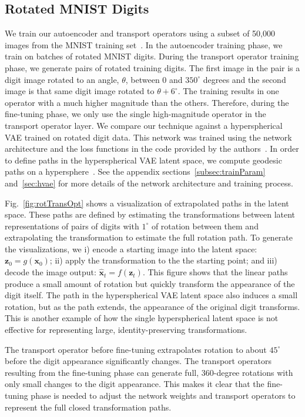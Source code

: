 \documentclass[letterpaper]{article} %
\newcommand{\vtr}[1]{\ensuremath{\mathbf{#1}}}
\begin{document}
\subsection{Rotated MNIST Digits}
We train our autoencoder and transport operators using a subset of 50,000 images from the MNIST training set~\cite{lecun1998gradient}. In the autoencoder training phase, we train on batches of rotated MNIST digits. During the transport operator training phase, we generate pairs of rotated training digits. The first image in the pair is a digit image rotated to an angle, $\theta$, between 0 and $350^{\circ}$ degrees and the second image is that same digit image rotated to $\theta + 6^{\circ}$. The training results in one operator with a much higher magnitude than the others. Therefore, during the fine-tuning phase, we only use the single high-magnitude operator in the transport operator layer. We compare our technique against a hyperspherical VAE trained on rotated digit data. This network was trained using the network architecture and the loss functions in the code provided by the authors~\cite{davidson2018hyperspherical}.  In order to define paths in the hyperspherical VAE latent space, we compute geodesic paths on a hypersphere~\cite{Ber17}. See the appendix sections~\ref{subsec:trainParam} and~\ref{sec:hvae} for more details of the network architecture and training process.


Fig.~\ref{fig:rotTransOpt} shows a visualization of extrapolated paths in the latent space. These paths are defined by estimating the transformations between latent representations of pairs of digits with $1^{\circ}$ of rotation between them and extrapolating the transformation to estimate the full rotation path. To generate the visualizations, we i) encode a starting image into the latent space: $\vtr{z}_0 = g(\vtr{x}_0)$; ii) apply the transformation to the the starting point; and iii) decode the image output: $\hat{\vtr{x}}_t = f(\vtr{z}_t)$. This figure shows that the linear paths produce a small amount of rotation but quickly transform the appearance of the digit itself. The path in the hyperspherical VAE latent space also induces a small rotation, but as the path extends, the appearance of the original digit transforms. This is another example of how the single hyperspherical latent space is not effective for representing large, identity-preserving transformations.

The transport operator before fine-tuning extrapolates rotation to about $45^{\circ}$ before the digit appearance significantly changes. The transport operators resulting from the fine-tuning phase can generate full, 360-degree rotations with only small changes to the digit appearance. This makes it clear that the fine-tuning phase is needed to adjust the network weights and transport operators to represent the full closed transformation paths.
\end{document}
